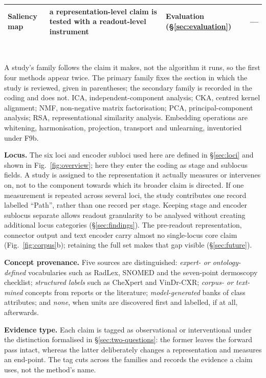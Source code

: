\begin{table}[!tbp]
\begin{tabular}{@{}L{3.0cm} L{6.1cm} L{3.3cm} L{2.9cm}@{}}
\addlinespace
Saliency map & a representation-level claim is tested with a readout-level instrument & Evaluation (\S\ref{sec:evaluation}) & --- \\
\bottomrule
\end{tabular}
\\[3pt]
\begin{minipage}{\textwidth}\footnotesize
A study's family follows the claim it makes, not the algorithm it runs, so the first four methods appear
twice. The primary family fixes the section in which the study is reviewed, given in parentheses; the
secondary family is recorded in the coding and does not. ICA, independent-component analysis; CKA,
centred kernel alignment; NMF, non-negative matrix factorisation; PCA, principal-component analysis;
RSA, representational similarity analysis. Embedding operations are whitening, harmonisation,
projection, transport and unlearning, inventoried under F9b.
\end{minipage}
\end{table}

\textbf{Locus.} The six loci and encoder subloci used here are defined in \S\ref{sec:loci} and shown in
Fig.~\ref{fig:overview}; here they enter the coding as stage and sublocus fields. A study is assigned to
the representation it actually measures or intervenes on, not to the component towards which its broader
claim is directed. If one measurement is repeated across several loci, the study contributes one record
labelled ``Path'', rather than one record per stage. Keeping stage and encoder sublocus separate allows
readout granularity to be analysed without creating additional locus categories
(\S\ref{sec:findings}). The pre-readout representation, connector output and text encoder carry almost
no single-locus core claim (Fig.~\ref{fig:corpus}b); retaining the full set makes that gap visible
(\S\ref{sec:future}).

\textbf{Concept provenance.} Five sources are distinguished: \emph{expert- or ontology-defined}
vocabularies such as RadLex, SNOMED and the seven-point dermoscopy checklist; \emph{structured labels}
such as CheXpert and VinDr-CXR; \emph{corpus- or text-mined} concepts from reports or the literature;
\emph{model-generated} banks of class attributes; and \emph{none}, when units are discovered first and
labelled, if at all, afterwards.

\textbf{Evidence type.} Each claim is tagged as observational or interventional under the distinction
formalised in \S\ref{sec:two-questions}: the former leaves the forward pass intact, whereas the latter
deliberately changes a representation and measures an end-point. The tag cuts across the families and
records the evidence a claim uses, not the method's name.

